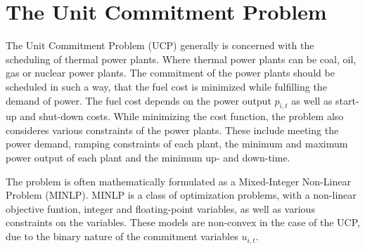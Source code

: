 \section{The Unit Commitment Problem}

The Unit Commitment Problem (UCP) generally is concerned with the scheduling of thermal power plants.
Where thermal power plants can be coal, oil, gas or nuclear power plants.
The commitment of the power plants should be scheduled in such a way, that the fuel cost is minimized
while fulfilling the demand of power.
The fuel cost depends on the power output $p_{i, t}$ as well as start-up and shut-down costs.
While minimizing the cost function, the problem also consideres various constraints of the power plants.
These include meeting the power demand,
ramping constraints of each plant,
the minimum and maximum power output of each plant
and the minimum up- and down-time.
\cite{Baldick1995}

The problem is often mathematically formulated as a Mixed-Integer Non-Linear Problem (MINLP).
MINLP is a class of optimization problems, with a non-linear objective funtion, integer and floating-point variables,
as well as various constraints on the variables.
These models are non-convex in the case of the UCP, due to the binary nature of the commitment variables $u_{i, t}$.
\cite{Baldick1995, Abujarad2017}